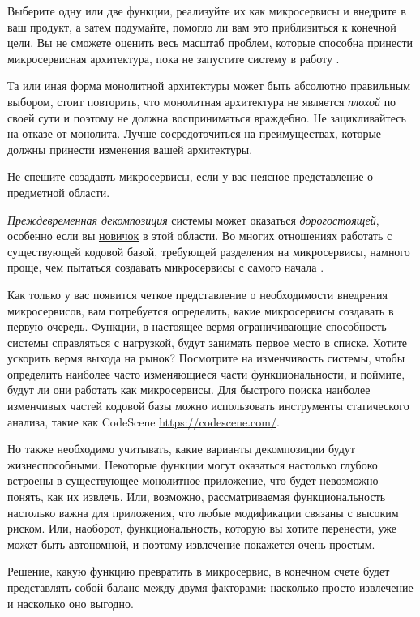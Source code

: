 \documentclass[%
	11pt,
	a4paper,
	utf8,
		]{article}
\begin{document}
Выберите одну или две функции, реализуйте их как микросервисы и внедрите в ваш продукт, а затем подумайте, помогло ли вам это приблизиться к конечной цели. Вы не сможете оценить весь масштаб проблем, которые способна принести микросервисная архитектура, пока не запустите систему в работу \cite[]{microservices-2024}.

Та или иная форма монолитной архитектуры может быть абсолютно правильным выбором, стоит повторить, что монолитная архитектура не является \emph{плохой} по своей сути и поэтому не должна восприниматься враждебно. Не зацикливайтесь на отказе от монолита. Лучше сосредоточиться на преимуществах, которые должны принести изменения вашей архитектуры.

Не спешите созадавть микросервисы, если у вас неясное представление о предметной области. 

\emph{Преждевременная декомпозиция} системы может оказаться \emph{дорогостоящей}, особенно если вы \underline{новичок} в этой области. Во многих отношениях работать с существующей кодовой базой, требующей разделения на микросервисы, намного проще, чем пытаться создавать микросервисы с самого начала \cite[]{microservices-2024}.

Как только у вас появится четкое  представление о необходимости внедрения микросервисов, вам потребуется определить, какие микросервисы создавать в первую очередь. Функции, в настоящее вермя ограничивающие способность системы справляться с нагрузкой, будут занимать первое место в списке. Хотите ускорить вермя выхода на рынок? Посмотрите на изменчивость системы, чтобы определить наиболее часто изменяющиеся части функциональности, и поймите, будут ли они работать как микросервисы. Для быстрого поиска наиболее изменчивых частей кодовой базы можно использовать инструменты статического анализа, такие как CodeScene \url{https://codescene.com/}.

Но также необходимо учитывать, какие варианты декомпозиции будут жизнеспособными. Некоторые функции могут оказаться настолько глубоко встроены в существующее монолитное приложение, что будет невозможно понять, как их извлечь. Или, возможно, рассматриваемая функциональность настолько важна для приложения, что любые модификации связаны с высоким риском. Или, наоборот, функциональность, которую вы хотите перенести, уже может быть автономной, и поэтому извлечение покажется очень простым.

Решение, какую функцию превратить в микросервис, в конечном счете будет представлять собой баланс между двумя факторами: насколько просто извлечение и насколько оно выгодно.
\end{document}
